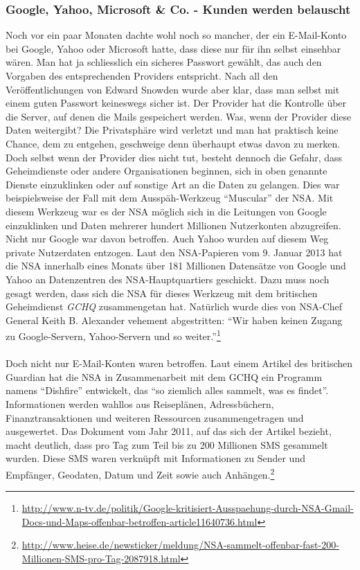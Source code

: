 \subsubsection{Google, Yahoo, Microsoft \& Co. - Kunden werden belauscht}
Noch vor ein paar Monaten dachte wohl noch so mancher, der ein E-Mail-Konto bei Google, Yahoo oder Microsoft hatte, dass diese nur für ihn selbst einsehbar wären. Man hat ja schliesslich ein sicheres Passwort gewählt, das auch den Vorgaben des entsprechenden Providers entspricht. Nach all den Veröffentlichungen von Edward Snowden wurde aber klar, dass man selbst mit einem guten Passwort keineswegs sicher ist. Der Provider hat die Kontrolle über die Server, auf denen die Mails gespeichert werden. Was, wenn der Provider diese Daten weitergibt? Die Privatsphäre wird verletzt und man hat praktisch keine Chance, dem zu entgehen, geschweige denn überhaupt etwas davon zu merken.
Doch selbst wenn der Provider dies nicht tut, besteht dennoch die Gefahr, dass Geheimdienste oder andere Organisationen beginnen, sich in oben genannte Dienste einzuklinken oder auf sonstige Art an die Daten zu gelangen.
Dies war beispielsweise der Fall mit dem Ausspäh-Werkzeug ``Muscular'' der NSA. Mit diesem Werkzeug war es der NSA möglich sich in die Leitungen von Google einzuklinken und Daten mehrerer hundert Millionen Nutzerkonten abzugreifen. Nicht nur Google war davon betroffen. Auch Yahoo wurden auf diesem Weg private Nutzerdaten entzogen. Laut den NSA-Papieren vom 9. Januar 2013 hat die NSA innerhalb eines Monats über 181 Millionen Datensätze von Google und Yahoo an Datenzentren des NSA-Hauptquartiers geschickt. Dazu muss noch gesagt werden, dass sich die NSA für dieses Werkzeug mit dem britischen Geheimdienst \textit{GCHQ} zusammengetan hat.
Natürlich wurde dies von NSA-Chef General Keith B. Alexander vehement abgestritten: ``Wir haben keinen Zugang zu Google-Servern, Yahoo-Servern und so weiter.''\footnote{\url{http://www.n-tv.de/politik/Google-kritisiert-Ausspaehung-durch-NSA-Gmail-Docs-und-Maps-offenbar-betroffen-article11640736.html}} 
\\
\\
Doch nicht nur E-Mail-Konten waren betroffen. Laut einem Artikel des britischen Guardian hat die NSA in Zusammenarbeit mit dem GCHQ ein Programm namens ``Dishfire'' entwickelt, das ``so ziemlich alles sammelt, was es findet''.
Informationen werden wahllos aus Reiseplänen, Adressbüchern, Finanztransaktionen und weiteren Ressourcen zusammengetragen und ausgewertet. Das Dokument vom Jahr 2011, auf das sich der Artikel bezieht, macht deutlich, dass pro Tag zum Teil bis zu 200 Millionen SMS gesammelt wurden. Diese SMS waren verknüpft mit Informationen zu Sender und Empfänger, Geodaten, Datum und Zeit sowie auch Anhängen.\footnote{\url{http://www.heise.de/newsticker/meldung/NSA-sammelt-offenbar-fast-200-Millionen-SMS-pro-Tag-2087918.html}}

